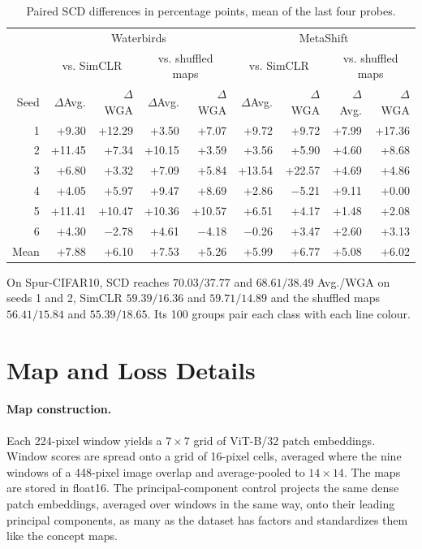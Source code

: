 \documentclass{article}
\begin{document}
\begin{table}[htbp]
\centering\small
\caption{Paired SCD differences in percentage points, mean of the last four probes.}
\begin{tabular}{rrrrrrrrr}
\toprule
& \multicolumn{4}{c}{Waterbirds} & \multicolumn{4}{c}{MetaShift} \\
& \multicolumn{2}{c}{vs. SimCLR} & \multicolumn{2}{c}{vs. shuffled maps} & \multicolumn{2}{c}{vs. SimCLR} & \multicolumn{2}{c}{vs. shuffled maps} \\
Seed & $\Delta$Avg. & $\Delta$WGA & $\Delta$Avg. & $\Delta$WGA & $\Delta$Avg. & $\Delta$WGA & $\Delta$Avg. & $\Delta$WGA \\
\midrule
1 & +9.30 & +12.29 & +3.50 & +7.07 & +9.72 & +9.72 & +7.99 & +17.36 \\
2 & +11.45 & +7.34 & +10.15 & +3.59 & +3.56 & +5.90 & +4.60 & +8.68 \\
3 & +6.80 & +3.32 & +7.09 & +5.84 & +13.54 & +22.57 & +4.69 & +4.86 \\
4 & +4.05 & +5.97 & +9.47 & +8.69 & +2.86 & $-$5.21 & +9.11 & +0.00 \\
5 & +11.41 & +10.47 & +10.36 & +10.57 & +6.51 & +4.17 & +1.48 & +2.08 \\
6 & +4.30 & $-$2.78 & +4.61 & $-$4.18 & $-$0.26 & +3.47 & +2.60 & +3.13 \\
\midrule
Mean & +7.88 & +6.10 & +7.53 & +5.26 & +5.99 & +6.77 & +5.08 & +6.02 \\
\bottomrule
\end{tabular}
\end{table}

On Spur-CIFAR10, SCD reaches $70.03/37.77$ and $68.61/38.49$ Avg./WGA on seeds 1 and 2, SimCLR $59.39/16.36$ and $59.71/14.89$ and the shuffled maps $56.41/15.84$ and $55.39/18.65$. Its 100 groups pair each class with each line colour.

\section{Map and Loss Details}\label{app:mapmath}

\paragraph{Map construction.}
Each 224-pixel window yields a $7\times7$ grid of ViT-B/32 patch embeddings. Window scores are spread onto a grid of 16-pixel cells, averaged where the nine windows of a 448-pixel image overlap and average-pooled to $14\times14$. The maps are stored in float16. The principal-component control projects the same dense patch embeddings, averaged over windows in the same way, onto their leading principal components, as many as the dataset has factors and standardizes them like the concept maps.
\end{document}
